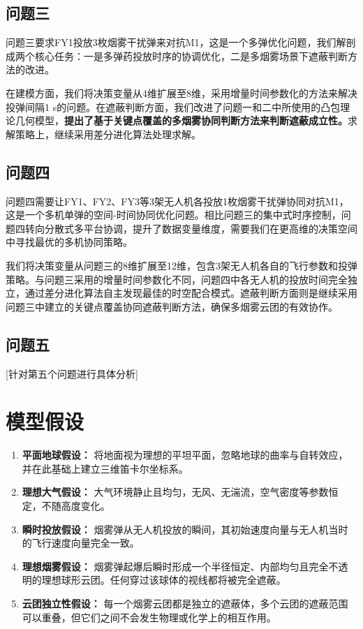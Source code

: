 \documentclass[fontset=SimSun]{ctexart}
\begin{document}
\subsection{问题三}
问题三要求FY1投放3枚烟雾干扰弹来对抗M1，这是一个多弹优化问题，我们解剖成两个核心任务：一是多弹药投放时序的协调优化，二是多烟雾场景下遮蔽判断方法的改进。

在建模方面，我们将决策变量从4维扩展至8维，采用增量时间参数化的方法来解决投弹间隔1 s的问题。在遮蔽判断方面，我们改进了问题一和二中所使用的凸包理论几何模型，\textbf{提出了基于关键点覆盖的多烟雾协同判断方法来判断遮蔽成立性。}求解策略上，继续采用差分进化算法处理求解。

\subsection{问题四}
问题四需要让FY1、FY2、FY3等3架无人机各投放1枚烟雾干扰弹协同对抗M1，这是一个多机单弹的空间-时间协同优化问题。相比问题三的集中式时序控制，问题四转向分散式多平台协调，提升了数据变量维度，需要我们在更高维的决策空间中寻找最优的多机协同策略。

我们将决策变量从问题三的8维扩展至12维，包含3架无人机各自的飞行参数和投弹策略。与问题三采用的增量时间参数化不同，问题四中各无人机的投放时间完全独立，通过差分进化算法自主发现最佳的时空配合模式。遮蔽判断方面则是继续采用问题三中建立的关键点覆盖协同遮蔽判断方法，确保多烟雾云团的有效协作。

\subsection{问题五}
[针对第五个问题进行具体分析]
\section{模型假设}

\begin{enumerate}[leftmargin=1cm]
    \item \textbf{平面地球假设：} 将地面视为理想的平坦平面，忽略地球的曲率与自转效应，并在此基础上建立三维笛卡尔坐标系。
    \item \textbf{理想大气假设：} 大气环境静止且均匀，无风、无湍流，空气密度等参数恒定，不随高度变化。
    \item \textbf{瞬时投放假设：} 烟雾弹从无人机投放的瞬间，其初始速度向量与无人机当时的飞行速度向量完全一致。
    \item \textbf{理想烟雾假设：} 烟雾弹起爆后瞬时形成一个半径恒定、内部均匀且完全不透明的理想球形云团。任何穿过该球体的视线都将被完全遮蔽。
    \item \textbf{云团独立性假设：} 每一个烟雾云团都是独立的遮蔽体，多个云团的遮蔽范围可以重叠，但它们之间不会发生物理或化学上的相互作用。
\end{enumerate}
\end{document}
